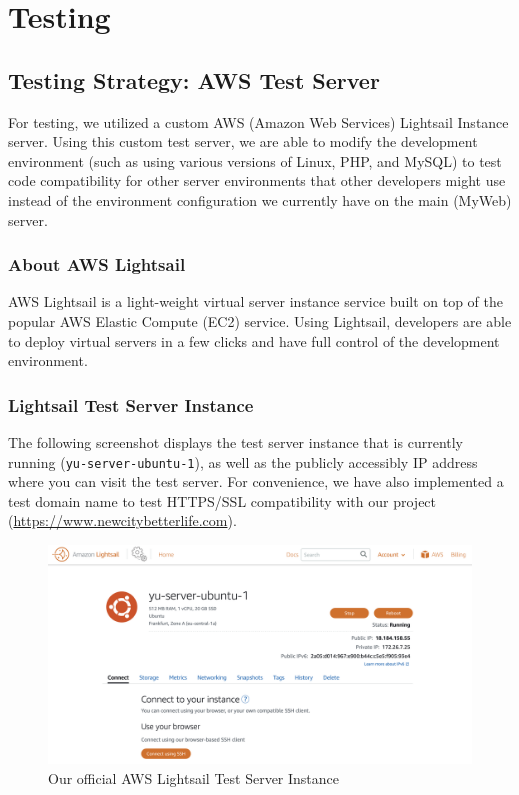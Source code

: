 \documentclass[12pt, letterpaper]{article}
\begin{document}
 \newpage

\section{Testing}

\subsection*{Testing Strategy: AWS Test Server}
For testing, we utilized a custom AWS (Amazon Web Services) Lightsail Instance server. Using this custom test server, we are able to modify the development environment (such as using various versions of Linux, PHP, and MySQL) to test code compatibility for other server environments that other developers might use instead of the environment configuration we currently have on the main (MyWeb) server.

\subsubsection*{About AWS Lightsail}
AWS Lightsail is a light-weight virtual server instance service built on top of the popular AWS Elastic Compute (EC2) service. Using Lightsail, developers are able to deploy virtual servers in a few clicks and have full control of the development environment.

\subsubsection*{Lightsail Test Server Instance}
The following screenshot displays the test server instance that is currently running (\lstinline{yu-server-ubuntu-1}), as well as the publicly accessibly IP address where you can visit the test server. For convenience, we have also implemented a test domain name to test HTTPS/SSL compatibility with our project (\url{https://www.newcitybetterlife.com}).

\begin{figure}[htbp]
	\centering
	\includegraphics[width=\textwidth]{images/28-lightsail-instance.png}
	\caption{Our official AWS Lightsail Test Server Instance}
 \end{figure}
\end{document}
